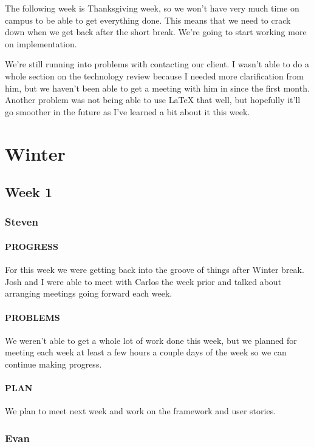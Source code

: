\documentclass[onecolumn, draftclsnofoot,10pt, compsoc]{IEEEtran}
\begin{document}
The following week is Thanksgiving week, so we won't have very much time on campus to be able to get everything done. This means that we need to crack down when we get back after the short break. We're going to start working more on implementation.

We're still running into problems with contacting our client. I wasn't able to do a whole section on the technology review because I needed more clarification from him, but we haven't been able to get a meeting with him in since the first month. Another problem was not being able to use LaTeX that well, but hopefully it'll go smoother in the future as I've learned a bit about it this week.



\section{Winter}


\subsection{Week 1}
	\subsubsection{Steven}
	\paragraph{ PROGRESS}
	For this week we were getting back into the groove of things after Winter break. Josh and I were able to meet with Carlos the week prior and talked about arranging meetings going forward each week.
	
	\paragraph{PROBLEMS}
	We weren't able to get a whole lot of work done this week, but we planned for meeting each week at least a few hours a couple days of the week so we can continue making progress. 
	
	\paragraph{PLAN}
	We plan to meet next week and work on the framework and user stories.
	
	\subsubsection{Evan}
	
\end{document}
